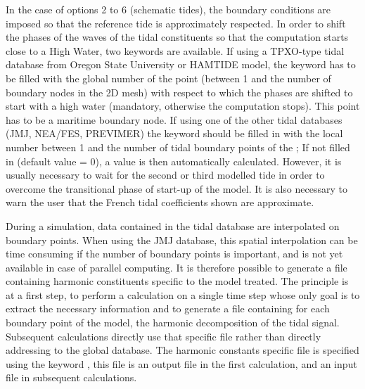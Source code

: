 In the case of options 2 to 6 (schematic tides), the boundary conditions are
imposed so that the reference tide is approximately respected.
In order to shift the phases of the waves of the tidal constituents so that
the computation starts close to a High Water, two keywords are available.
If using a TPXO-type tidal database from Oregon State University
or HAMTIDE model, the keyword
 has to be filled
with the global number of the point (between 1 and the number of boundary
nodes in the 2D mesh) with respect to which the phases are shifted
to start with a high water (mandatory, otherwise the computation stops).
This point has to be a maritime boundary node.
If using one of the other tidal databases (JMJ, NEA/FES, PREVIMER) the keyword
 should be filled in
with the local number between 1 and the number of tidal boundary points of the
; If not filled in (default value = 0), a value
is then automatically calculated.
However, it is usually necessary to wait for the second or third modelled tide
in order to overcome the transitional phase of start-up of the model.
It is also necessary to warn the user that the French tidal coefficients shown
are approximate.

During a simulation, data contained in the tidal database are interpolated
on boundary points.
When using the JMJ database, this spatial interpolation can be time consuming
if the number of boundary points is important, and is not yet available in case
of parallel computing.
It is therefore possible to generate a file containing harmonic constituents
specific to the model treated.
The principle is at a first step, to perform a calculation on a single time step
whose only goal is to extract the necessary information and to generate a file
containing for each boundary point of the model, the harmonic decomposition of
the tidal signal.
Subsequent calculations directly use that specific file rather than directly
addressing to the global database.
The harmonic constants specific file is specified using the keyword
, this file is an output file in the first
calculation, and an input file in subsequent calculations.
\\


